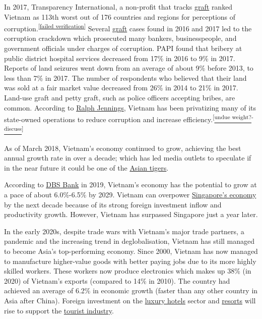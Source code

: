 \documentclass[openany]{book}
\begin{document}
In 2017, Transparency International, a non-profit that tracks \href{https://en.wikipedia.org/wiki/Graft_(politics)}{graft} ranked Vietnam as 113th worst out of 176 countries and regions for perceptions of corruption.\cite{56}\textsuperscript{\href{https://en.wikipedia.org/wiki/Wikipedia:Verifiability}{[failed verification]}} Several \href{https://en.wikipedia.org/wiki/Graft_(politics)}{graft} cases found in 2016 and 2017 led to the corruption crackdown which prosecuted many bankers, businesspeople, and government officials under charges of corruption. PAPI found that bribery at public district hospital services decreased from 17\% in 2016 to 9\% in 2017.\cite{56} Reports of land seizures went down from an average of about 9\% before 2013, to less than 7\% in 2017. The number of respondents who believed that their land was sold at a fair market value decreased from 26\% in 2014 to 21\% in 2017.\cite{56} Land-use graft and petty graft, such as police officers accepting bribes, are common. According to \href{https://en.wikipedia.org/wiki/Ralph_Jennings}{Ralph Jennings}, Vietnam has been privatizing many of its state-owned operations to reduce corruption and increase efficiency.\cite{57}\textsuperscript{[}\href{https://en.wikipedia.org/wiki/Wikipedia:Neutral_point_of_view#Due_and_undue_weight}{\textsuperscript{undue weight?}}\textsuperscript{-}\href{https://en.wikipedia.org/wiki/Talk:Economy_of_Vietnam#undue}{\textsuperscript{discuss}}\textsuperscript{]}

As of March 2018, Vietnam's economy continued to grow, achieving the best annual growth rate in over a decade; which has led media outlets to speculate if in the near future it could be one of the \href{https://en.wikipedia.org/wiki/Four_Asian_Tigers}{Asian tigers}.\cite{58}\cite{59}

According to \href{https://en.wikipedia.org/wiki/DBS_Bank}{DBS Bank} in 2019, Vietnam's economy has the potential to grow at a pace of about 6.0\%-6.5\% by 2029. Vietnam can overpower \href{https://en.wikipedia.org/wiki/Economy_of_Singapore}{Singapore's economy} by the next decade because of its strong foreign investment inflow and productivity growth.\cite{60} However, Vietnam has surpassed Singapore just a year later.

In the early 2020s, despite trade wars with Vietnam's major trade partners, a pandemic and the increasing trend in deglobalisation, Vietnam has still managed to become Asia's top-performing economy.\cite{61} Since 2000, Vietnam has now managed to manufacture higher-value goods with better paying jobs due to its more highly skilled workers. These workers now produce electronics which makes up 38\% (in 2020) of Vietnam's exports (compared to 14\% in 2010). The country had achieved an average of 6.2\% in economic growth (faster than any other country in Asia after China).\cite{62} Foreign investment on the \href{https://en.wikipedia.org/wiki/Luxury_hotel}{luxury hotels} sector and \href{https://en.wikipedia.org/wiki/Resorts}{resorts} will rise to support the \href{https://en.wikipedia.org/wiki/Tourist_industry}{tourist industry}.\cite{63}
\end{document}
